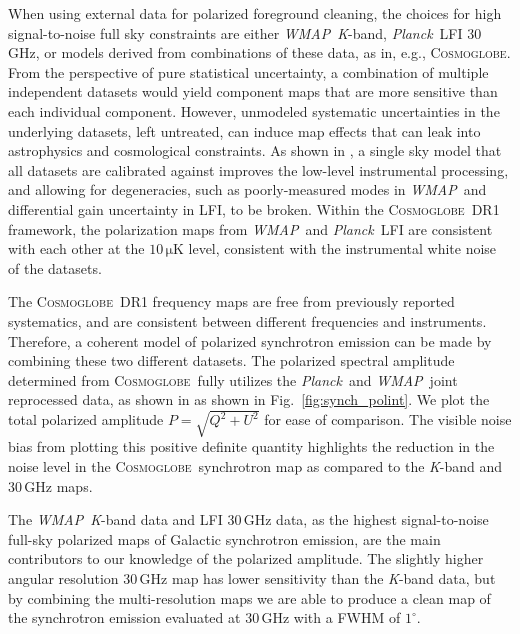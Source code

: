 \documentclass[twocolumn]{../../common/aa}
\def\WMAP{\emph{WMAP}}
\def\WMAPnine{\emph{WMAP9}}
\def\Planck{\emph{Planck}}
\def\commanderthree{\texttt{Commander3}}
\newcommand{\cosmoglobe}{\textsc{Cosmoglobe}}
\newcommand{\K}[0]{\textit K}
\begin{document}
When using external data for polarized foreground cleaning, the choices for high signal-to-noise full sky constraints are either \WMAP\ \K-band, \Planck\ LFI 30\,GHz, or models derived from combinations of these data, as in, e.g., \cosmoglobe. From the perspective of pure statistical uncertainty, a combination of multiple independent datasets would yield component maps that are more sensitive than each individual component. However, unmodeled systematic uncertainties in the underlying datasets, left untreated, can induce map effects that can leak into astrophysics and cosmological constraints.
As shown in \citet{watts2023_dr1}, a single sky model that all datasets are calibrated against improves the low-level instrumental processing, and allowing for degeneracies, such as poorly-measured modes in \WMAP\ and differential gain uncertainty in LFI, to be broken. Within the \cosmoglobe\ DR1 framework, the polarization maps from \WMAP\ and \Planck\ LFI are consistent with each other at the $10\,\mathrm{\mu K}$ level, consistent with the instrumental white noise of the datasets.

The \cosmoglobe\ DR1 frequency maps are free from previously reported systematics, and are consistent between different frequencies and instruments. Therefore, a coherent model of polarized synchrotron emission can be made by combining these two different datasets.
The polarized spectral amplitude determined from \cosmoglobe\ fully utilizes the \Planck\ and \WMAP\ joint reprocessed data, as shown in as shown in Fig.~\ref{fig:synch_polint}. 
We plot the total polarized amplitude $P=\sqrt{Q^2+U^2}$ for ease of comparison. The visible noise bias from plotting this positive definite quantity highlights the reduction in the noise level in the \cosmoglobe\ synchrotron map as compared to the \K-band and 30\,GHz maps.





The \WMAP\ \K-band data and LFI 30\,GHz data, as the highest signal-to-noise full-sky polarized maps of Galactic synchrotron emission, are the main contributors to our knowledge of the polarized amplitude. The slightly higher angular resolution 30\,GHz map has lower sensitivity than the \K-band data, but by combining the multi-resolution maps we are able to produce a clean map of the synchrotron emission evaluated at 30\,GHz with a FWHM of $1^\circ$.

\end{document}
